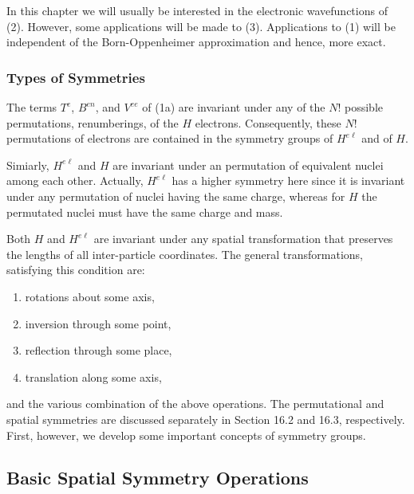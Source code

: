 In this chapter we will usually be interested in the electronic 
wavefunctions of (2).  However, some applications will be made to 
(3).  Applications to (1) will be independent of the Born-Oppenheimer 
approximation and hence, more exact.

\subsubsection{Types of Symmetries}

The terms $T^e$, $B^{en}$, and $V^{ee}$ of (1a) are invariant under 
any of the $N!$ possible permutations, renumberings, of the $H$ 
electrons. Consequently, these $N!$ permutations of electrons are 
contained in the symmetry groups of $H^{e \ell}$ and of $H$.

Simiarly, $H^{e \ell}$ and $H$ are invariant under an permutation of 
equivalent nuclei among each other.  Actually, $H^{e \ell}$ has a 
higher symmetry here since it is invariant under any permutation of 
nuclei having the same charge, whereas for $H$ the permutated nuclei 
must have the same charge and mass.

Both $H$ and $H^{e \ell}$ are invariant under any spatial 
transformation that preserves the lengths of all inter-particle 
coordinates.  The general transformations, satisfying this condition 
are:
\begin{enumerate}
\item rotations about some axis,
\item inversion through some point,
\item reflection through some place,
\item translation along some axis,
\end{enumerate}
and the various combination of the above operations.  The 
permutational and spatial symmetries are discussed separately in 
Section 16.2 and 16.3, respectively.  First, however, we develop some 
important concepts of symmetry groups.

\subsection{Basic Spatial Symmetry Operations}

